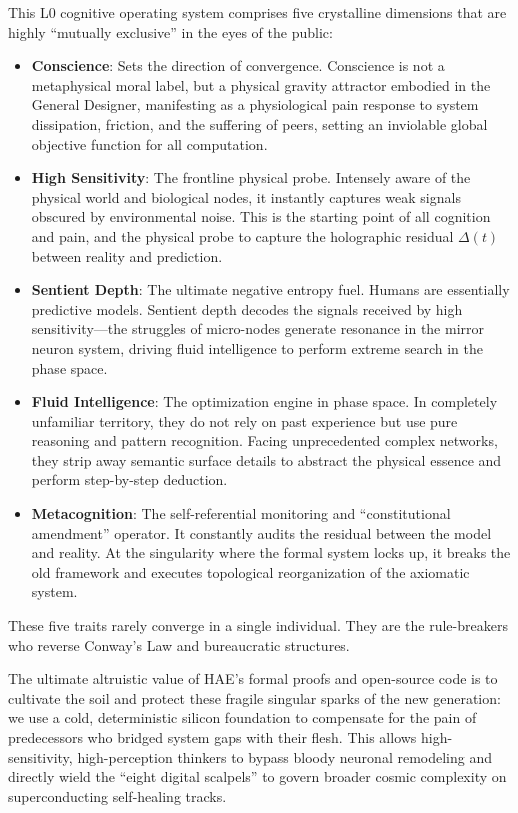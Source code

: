 \documentclass{article}
\begin{document}
This L0 cognitive operating system comprises five crystalline dimensions that are highly ``mutually exclusive'' in the eyes of the public:
\begin{itemize}
    \item \textbf{Conscience}: Sets the direction of convergence. Conscience is not a metaphysical moral label, but a physical gravity attractor embodied in the General Designer, manifesting as a physiological pain response to system dissipation, friction, and the suffering of peers, setting an inviolable global objective function for all computation.
    \item \textbf{High Sensitivity}: The frontline physical probe. Intensely aware of the physical world and biological nodes, it instantly captures weak signals obscured by environmental noise. This is the starting point of all cognition and pain, and the physical probe to capture the holographic residual $\Delta(t)$ between reality and prediction.
    \item \textbf{Sentient Depth}: The ultimate negative entropy fuel. Humans are essentially predictive models. Sentient depth decodes the signals received by high sensitivity---the struggles of micro-nodes generate resonance in the mirror neuron system, driving fluid intelligence to perform extreme search in the phase space.
    \item \textbf{Fluid Intelligence}: The optimization engine in phase space. In completely unfamiliar territory, they do not rely on past experience but use pure reasoning and pattern recognition. Facing unprecedented complex networks, they strip away semantic surface details to abstract the physical essence and perform step-by-step deduction.
    \item \textbf{Metacognition}: The self-referential monitoring and ``constitutional amendment'' operator. It constantly audits the residual between the model and reality. At the singularity where the formal system locks up, it breaks the old framework and executes topological reorganization of the axiomatic system.
\end{itemize}

These five traits rarely converge in a single individual. They are the rule-breakers who reverse Conway's Law and bureaucratic structures.

The ultimate altruistic value of HAE's formal proofs and open-source code is to cultivate the soil and protect these fragile singular sparks of the new generation: we use a cold, deterministic silicon foundation to compensate for the pain of predecessors who bridged system gaps with their flesh. This allows high-sensitivity, high-perception thinkers to bypass bloody neuronal remodeling and directly wield the ``eight digital scalpels'' to govern broader cosmic complexity on superconducting self-healing tracks.
\end{document}
